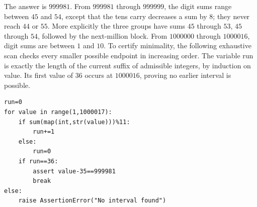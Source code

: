 The answer is $\boxed{999981}$. From $999981$ through $999999$, the digit sums range between $45$ and $54$, except that the tens carry decreases a sum by $8$; they never reach $44$ or $55$. More explicitly the three groups have sums $45$ through $53$, $45$ through $54$, followed by the next-million block. From $1000000$ through $1000016$, digit sums are between $1$ and $10$. To certify minimality, the following exhaustive scan checks every smaller possible endpoint in increasing order. The variable run is exactly the length of the current suffix of admissible integers, by induction on value. Its first value of $36$ occurs at $1000016$, proving no earlier interval is possible.\begin{verbatim}
run=0
for value in range(1,1000017):
    if sum(map(int,str(value)))%11:
        run+=1
    else:
        run=0
    if run==36:
        assert value-35==999981
        break
else:
    raise AssertionError("No interval found")
\end{verbatim}
